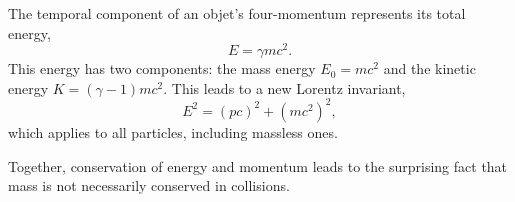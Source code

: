 \documentclass[../p023main.tex]{subfiles}
\begin{document}
\begin{summary}
    The temporal component of an objet's four-momentum represents its total energy,
    \[ E = \gamma mc^2. \]
    This energy has two components: the mass energy $E_0 = mc^2$ and the kinetic energy $K = (\gamma - 1)mc^2$.
    This leads to a new Lorentz invariant,
    \[ E^2 = (pc)^2 + (mc^2)^2, \]
    which applies to all particles, including massless ones.

    Together, conservation of energy and momentum leads to the surprising fact that mass is not necessarily conserved in collisions.
\end{summary}

    
\end{document}
